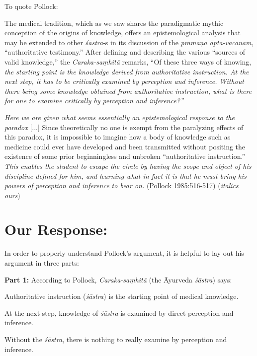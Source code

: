 To quote Pollock:
\begin{myquote}
The medical tradition, which as we saw shares the paradigmatic mythic conception of the origins of knowledge, offers an epistemological analysis that may be extended to other {\sl śāstra}-s in its discussion of the {\sl pra\-māṇa āpta-vacanam}, ``authoritative testimony.''  After defining and describing the various ``sources of valid knowledge,'' the {\sl Caraka-saṃhitā} remarks, ``Of these three ways of knowing, {\sl the starting point is the knowledge derived from authoritative instruction. At the next step, it has to be critically examined by perception and inference. Without there being some knowledge obtained from authoritative instruction, what is there for one to examine critically by perception and inference?''}

{{\sl Here we are given what seems essentially an epistemological response to the paradox}} [...] Since theoretically no one is exempt from the paralyzing effects of this paradox, it is impossible to imagine how a body of knowledge such as medicine could ever have developed and been transmitted without positing the existence of some prior beginningless and unbroken ``authoritative instruction.'' {\sl This enables the student to escape the circle by having the scope and object of his discipline defined for him, and learning what in fact it is that he must bring his powers of perception and inference to bear on.}
\hfill (Pollock 1985:516-517) ({\sl italics ours})
\end{myquote}

\section*{Our Response:}

In order to properly understand Pollock's argument, it is helpful to lay out his argument in three parts:

{\bf Part 1:}
According to Pollock, {\sl Caraka-saṃhitā} (the Āyurveda {\sl śāstra}) says:
\begin{myquote}
Authoritative instruction ({\sl śāstra}) is the starting point of medical knowledge. 

At the next step, knowledge of {\sl śāstra} is examined by direct perception and inference.

Without the {\sl śāstra}, there is nothing to really examine by perception and inference.  
\end{myquote}

